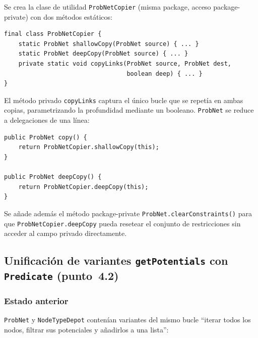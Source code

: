 \documentclass[11pt,a4paper]{article}
\newcommand{\code}[1]{\texttt{#1}}
\begin{document}
Se crea la clase de utilidad \code{ProbNetCopier} (misma package, acceso
package-private) con dos métodos estáticos:

\begin{lstlisting}
final class ProbNetCopier {
    static ProbNet shallowCopy(ProbNet source) { ... }
    static ProbNet deepCopy(ProbNet source) { ... }
    private static void copyLinks(ProbNet source, ProbNet dest,
                                  boolean deep) { ... }
}
\end{lstlisting}

El método privado \code{copyLinks} captura el único bucle que se repetía
en ambas copias, parametrizando la profundidad mediante un booleano.
\code{ProbNet} se reduce a delegaciones de una línea:

\begin{lstlisting}
public ProbNet copy() {
    return ProbNetCopier.shallowCopy(this);
}

public ProbNet deepCopy() {
    return ProbNetCopier.deepCopy(this);
}
\end{lstlisting}

Se añade además el método package-private \code{ProbNet.clearConstraints()}
para que \code{ProbNetCopier.deepCopy} pueda resetear el conjunto de
restricciones sin acceder al campo privado directamente.

\subsection{Unificación de variantes \code{getPotentials} con \code{Predicate}
            (punto~4.2)}

\subsubsection*{Estado anterior}

\code{ProbNet} y \code{NodeTypeDepot} contenían variantes del mismo bucle
``iterar todos los nodos, filtrar sus potenciales y añadirlos a una lista'':
\end{document}

